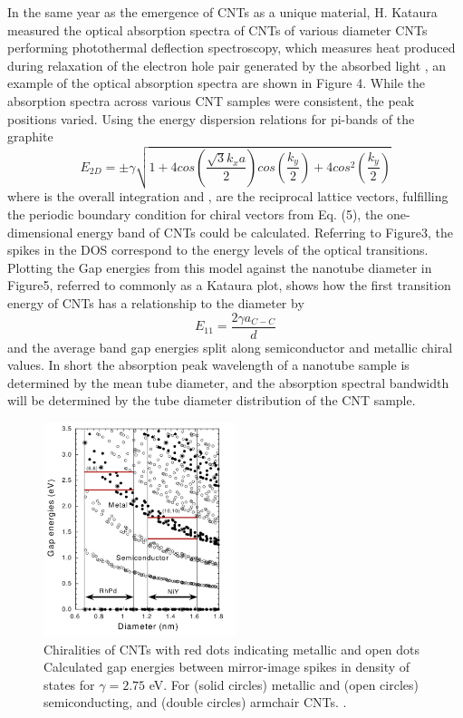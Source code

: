 In the same year as the emergence of CNTs as a unique material, H. Kataura measured the optical absorption spectra of CNTs of various diameter CNTs performing photothermal deflection spectroscopy, which measures heat produced during relaxation of the electron hole pair generated by the absorbed light \cite{kataura}, an example of the optical absorption spectra  are shown in Figure 4. While the absorption spectra across various CNT samples were consistent, the peak positions varied. Using the energy dispersion relations for pi-bands of the graphite \cite{kataura}
\begin{equation}
	E_{2D} = \pm\gamma\sqrt{1+4cos(\frac{\sqrt{3}k_x a}{2})cos(\frac{k_y}{2}) + 4cos^2(\frac{k_y}{2}) }
\end{equation}
where  is the overall integration and ,  are the reciprocal lattice vectors, fulfilling the periodic boundary condition for chiral vectors from Eq. (5), the one-dimensional energy band of CNTs could be calculated. Referring to Figure3, the spikes in the DOS correspond to the energy levels of the optical transitions. Plotting the Gap energies from this model against the nanotube diameter in Figure5, referred to commonly as a Kataura plot, shows how the first transition energy of CNTs has a relationship to the diameter by
\begin{equation}
	E_{11} = \frac{2\gamma a_{C-C}}{d}
\end{equation}
and the average band gap energies split along semiconductor and metallic chiral values. In short the absorption peak wavelength of a nanotube sample is determined by the mean tube diameter, and the absorption spectral bandwidth will be determined by the tube diameter distribution of the CNT sample.
\begin{figure}[h]
	\centering
	\includegraphics[width=0.5\textwidth]{./Figures/CNTs/kautura.png}
	\caption{Chiralities of CNTs with red dots indicating metallic and open dots  Calculated gap energies between mirror-image spikes in density of states for $\gamma = 2.75$ eV. For (solid circles) metallic  and (open circles) semiconducting, and (double circles) armchair CNTs. \cite{kataura}. }
	\label{fig:kataura}
\end{figure}
\clearpage

